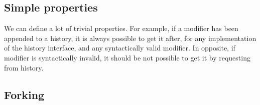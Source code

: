 \subsection{Simple properties}

We can define a lot of trivial properties. For example, if a modifier has been appended to a history, it is always possible to get it after, for any implementation of the history interface, and any syntactically valid modifier. In opposite, if modifier is syntactically invalid, it should be not possible to get it by requesting from history. 

\subsection{Forking}


